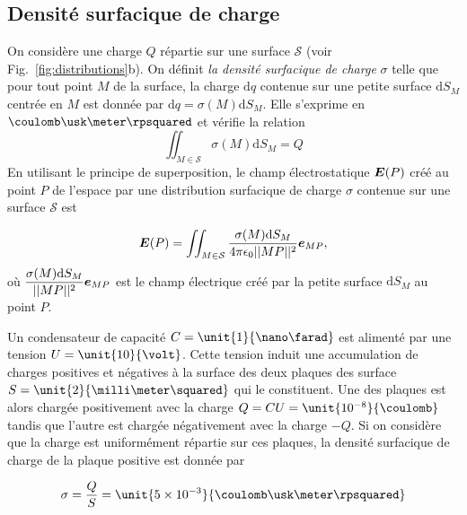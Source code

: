 \subsection{Densité surfacique de charge}
	On considère une charge $Q$ répartie sur une surface $\mathcal{S}$
	(voir Fig.~\ref{fig:distributions}b). 
	On définit \emph{
	la densité surfacique de charge} $\sigma$ 
	telle que pour tout point $M$ de la surface,
	la charge $\mathrm{d}q$ contenue sur une petite surface $\mathrm{d}S_M$ centrée 
	en $M$ est donnée par $\mathrm{d}q = \sigma(M) \mathrm{d}S_M$.
	Elle s'exprime en $\coulomb \usk  \meter \rpsquared$ et vérifie la relation
\begin{equation*}
	\iint_{M \in \mathcal{S}} \sigma(M) \mathrm{d}S_M = Q
\end{equation*}
En utilisant le principe de superposition, le champ électrostatique $\vece(P)$
créé au point $P$ de l'espace par une distribution surfacique de charge $\sigma$
contenue sur une surface $\mathcal{S}$ est

\begin{equation}
	\vece(P) = \iint_{M \in \mathcal{S}} 
	\dfrac{\sigma(M) \mathrm{d}S_M}{4 \pi \epsilon_0 ||MP||^2}\mitbf{e}_{MP},
\end{equation}
où $\dfrac{\sigma(M) \mathrm{d}S_M}{||MP||^2}\mitbf{e}_{MP}$ est le champ 
électrique créé par la petite surface $\mathrm{d}S_M$ au point $P$.

\begin{exemple}
	Un condensateur de capacité $C = \unit{1}{\nano \farad}$ est alimenté 
	par une tension $U = \unit{10}{\volt}$. Cette tension induit une 
	accumulation de charges positives et négatives à la surface des deux 
	plaques des surface $S = \unit{2}{\milli \meter \squared}$
	qui le constituent. Une des plaques est alors chargée positivement
	avec la charge $Q = CU = \unit{10^{-8}}{\coulomb}$ 
	tandis que l'autre est chargée négativement avec la 
	charge $-Q$. Si on considère que la charge est uniformément répartie
	sur ces plaques, la densité surfacique de charge de la plaque positive
	est donnée par

	\begin{equation*}
		\sigma = \dfrac{Q}{S} = \unit{5 \times 10^{-3}}
		                        {\coulomb \usk \meter \rpsquared}
	\end{equation*}
\end{exemple}
